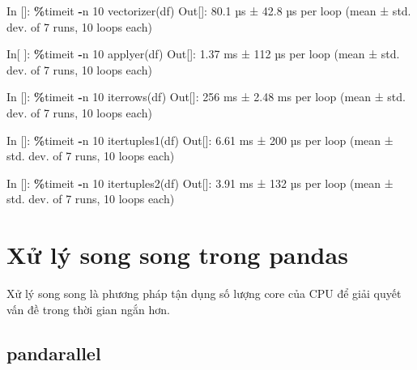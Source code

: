 \documentclass[
]{book}
\newenvironment{Shaded}{\begin{snugshade}}{\end{snugshade}}
\newcommand{\DecValTok}[1]{\textcolor[rgb]{0.00,0.00,0.81}{#1}}
\newcommand{\FloatTok}[1]{\textcolor[rgb]{0.00,0.00,0.81}{#1}}
\newcommand{\NormalTok}[1]{#1}
\newcommand{\OperatorTok}[1]{\textcolor[rgb]{0.81,0.36,0.00}{\textbf{#1}}}
\begin{document}
\begin{Shaded}
\begin{Highlighting}[]
\NormalTok{In []: }\OperatorTok{\%}\NormalTok{timeit }\OperatorTok{{-}}\NormalTok{n }\DecValTok{10}\NormalTok{ vectorizer(df)}
\NormalTok{Out[]:}
\FloatTok{80.1}\NormalTok{ µs ± }\FloatTok{42.8}\NormalTok{ µs per loop (mean ± std. dev. of }\DecValTok{7}\NormalTok{ runs, }\DecValTok{10}\NormalTok{ loops each)}

\NormalTok{In[ ]: }\OperatorTok{\%}\NormalTok{timeit }\OperatorTok{{-}}\NormalTok{n }\DecValTok{10}\NormalTok{ applyer(df)}
\NormalTok{Out[]:}
\FloatTok{1.37}\NormalTok{ ms ± }\DecValTok{112}\NormalTok{ µs per loop (mean ± std. dev. of }\DecValTok{7}\NormalTok{ runs, }\DecValTok{10}\NormalTok{ loops each)}

\NormalTok{In []: }\OperatorTok{\%}\NormalTok{timeit }\OperatorTok{{-}}\NormalTok{n }\DecValTok{10}\NormalTok{ iterrows(df)}
\NormalTok{Out[]:}
\DecValTok{256}\NormalTok{ ms ± }\FloatTok{2.48}\NormalTok{ ms per loop (mean ± std. dev. of }\DecValTok{7}\NormalTok{ runs, }\DecValTok{10}\NormalTok{ loops each)}

\NormalTok{In []: }\OperatorTok{\%}\NormalTok{timeit }\OperatorTok{{-}}\NormalTok{n }\DecValTok{10}\NormalTok{ itertuples1(df)}
\NormalTok{Out[]: }
\FloatTok{6.61}\NormalTok{ ms ± }\DecValTok{200}\NormalTok{ µs per loop (mean ± std. dev. of }\DecValTok{7}\NormalTok{ runs, }\DecValTok{10}\NormalTok{ loops each)}

\NormalTok{In []: }\OperatorTok{\%}\NormalTok{timeit }\OperatorTok{{-}}\NormalTok{n }\DecValTok{10}\NormalTok{ itertuples2(df)}
\NormalTok{Out[]:}
\FloatTok{3.91}\NormalTok{ ms ± }\DecValTok{132}\NormalTok{ µs per loop (mean ± std. dev. of }\DecValTok{7}\NormalTok{ runs, }\DecValTok{10}\NormalTok{ loops each)}
\end{Highlighting}
\end{Shaded}

\section{Xử lý song song trong pandas}\label{xux1eed-luxfd-song-song-trong-pandas}

Xử lý song song là phương pháp tận dụng số lượng core của CPU để giải quyết vấn đề trong thời gian ngắn hơn.

\subsection{pandarallel}\label{pandarallel}
\end{document}
